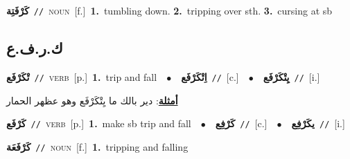 \documentclass[10pt,a4paper,twoside]{article} %
\begin{document}
\begin{multicols}{2}
{\setlength\topsep{0pt}\textbf{\foreignlanguage{arabic}{كَرْفَتِة}}\ {\color{gray}\texttt{//}\color{black}}\ \textsc{noun}\ [f.]\ \textbf{1.}~tumbling down.  \textbf{2.}~tripping over sth.  \textbf{3.}~cursing at sb\ } \vspace{2mm}

\vspace{-3mm}
\subsection*{\color{blue}\foreignlanguage{arabic}{ك.ر.ف.ع}\color{blue}{}} 

{\setlength\topsep{0pt}\textbf{\foreignlanguage{arabic}{تْكَرْفَع}}\ {\color{gray}\texttt{//}\color{black}}\ \textsc{verb}\ [p.]\ \textbf{1.}~trip and fall\ \ $\bullet$\ \ \setlength\topsep{0pt}\textbf{\foreignlanguage{arabic}{اِتْكَرْفَع}}\ {\color{gray}\texttt{//}\color{black}}\ [c.]\ \ $\bullet$\ \ \setlength\topsep{0pt}\textbf{\foreignlanguage{arabic}{يِتْكَرْفَع}}\ {\color{gray}\texttt{//}\color{black}}\ [i.]\  \begin{flushright}\color{gray}\foreignlanguage{arabic}{\textbf{\underline{\foreignlanguage{arabic}{أمثلة}}}: دير بالك ما يِتْكَرْفَع وهو عظهر الحمار}\end{flushright}\color{black}} \vspace{2mm}

{\setlength\topsep{0pt}\textbf{\foreignlanguage{arabic}{كَرْفَع}}\ {\color{gray}\texttt{//}\color{black}}\ \textsc{verb}\ [p.]\ \textbf{1.}~make sb trip and fall\ \ $\bullet$\ \ \setlength\topsep{0pt}\textbf{\foreignlanguage{arabic}{كَرْفِع}}\ {\color{gray}\texttt{//}\color{black}}\ [c.]\ \ $\bullet$\ \ \setlength\topsep{0pt}\textbf{\foreignlanguage{arabic}{يكَرْفِع}}\ {\color{gray}\texttt{//}\color{black}}\ [i.]\ } \vspace{2mm}

{\setlength\topsep{0pt}\textbf{\foreignlanguage{arabic}{كَرْفَعَة}}\ {\color{gray}\texttt{//}\color{black}}\ \textsc{noun}\ [f.]\ \textbf{1.}~tripping and falling\ } \vspace{2mm}


\end{multicols}
\end{document}
